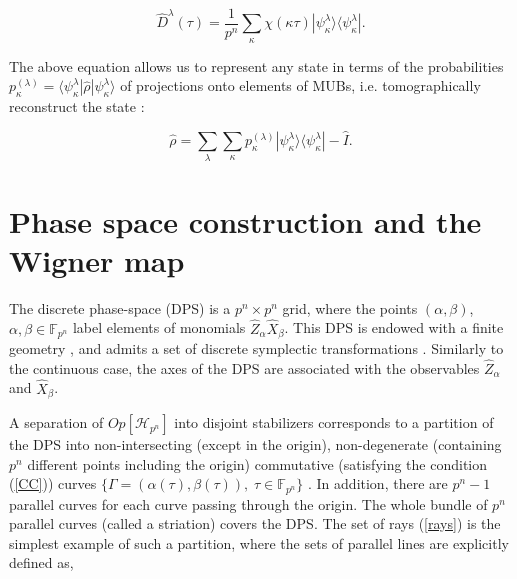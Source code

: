 \documentclass[quantumrep,article,submit,pdftex,moreauthors]{Definitions/mdpi}
\begin{document}
\begin{equation}
  \hat{D}^{\lambda}(\tau)
  = \frac{1}{p^{n}} \sum_{\kappa }\chi(\kappa \tau)
  |\psi_{\kappa}^{\lambda}\rangle \langle\psi_{\kappa}^{\lambda}|.
  \label{Dexp}
\end{equation}

The above equation allows us to represent any state in terms of the
probabilities $p_{\kappa}^{(\lambda)} = \langle \psi_{\kappa }^{\lambda }|
\hat{\rho}|\psi_{\kappa}^{\lambda}\rangle$ of projections onto elements
of MUBs, i.e. tomographically reconstruct the state
\cite{gibbons,galvao,cormick,ivanovic,DFW11,DFW12,Durt2006}: 

\begin{equation}
  \hat{\rho}
  = \sum_{\lambda}\sum_{\kappa}p_{\kappa}^{(\lambda)}
  |\psi_{\kappa }^{\lambda}\rangle \langle \psi_{\kappa}^{\lambda}|
  - \hat{I}.
  \label{tom r}
\end{equation}

\section{Phase space construction and the Wigner map}

The discrete phase-space (DPS) \cite{gibbons,galvao,cormick,DFW11,DFW12} is a
$p^{n}\times p^{n}$ grid, where the points $(\alpha ,\beta )$, $\alpha,\beta \in
\mathbb{F}_{p^{n}}$ label elements of monomials $\hat{Z}_{\alpha
}\hat{X}_{\beta}$. This DPS is endowed with a finite geometry
\cite{gibbons,galvao,cormick,DFW11,DFW12,FF}, and admits a set of discrete
symplectic transformations \cite{DFW2-1,DFW2-2,DFW2-3,DFW2-4,klimov06}.
Similarly to the continuous case, the axes of the DPS are associated with the
observables $\hat{Z}_{\alpha}$ and $\hat{X}_{\beta}$.

A separation of $Op[\mathcal{H}_{p^{n}}]$ into disjoint stabilizers
corresponds to a partition of the DPS into non-intersecting (except in the
origin), non-degenerate (containing $p^{n}$ different points including the
origin) commutative (satisfying the condition (\ref{CC})) curves $\{\Gamma
=\left( \alpha (\tau ),\beta (\tau )\right) ,\;\tau \in \mathbb{F}_{p^{n}}\}$
\cite{GS2,JPA09}. In addition, there are $p^{n}-1$ parallel curves for each
curve passing through the origin. The whole bundle of $p^{n}$ parallel
curves (called a striation) covers the DPS. The set of rays (\ref{rays}) is the
simplest example of such a partition, where the sets of parallel lines are
explicitly defined as, 
\end{document}
